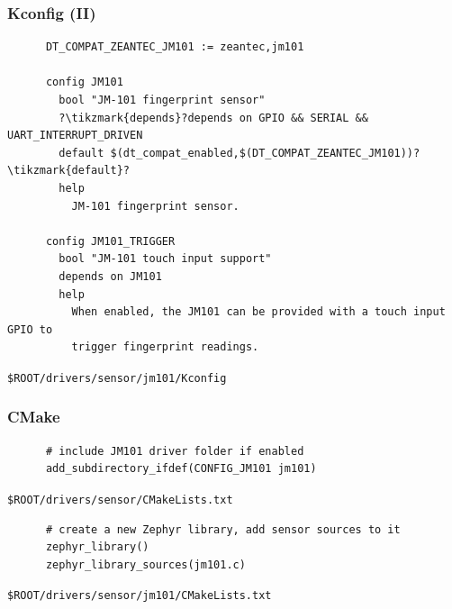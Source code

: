 \documentclass[handout]{beamer}
\begin{document}
\begin{frame}[fragile]
  \frametitle{Kconfig (II)}

  \vspace{2.5em}

  \begin{listing}[H]
    \begin{verbatim}
      DT_COMPAT_ZEANTEC_JM101 := zeantec,jm101

      config JM101
        bool "JM-101 fingerprint sensor"
        ?\tikzmark{depends}?depends on GPIO && SERIAL && UART_INTERRUPT_DRIVEN
        default $(dt_compat_enabled,$(DT_COMPAT_ZEANTEC_JM101))?\tikzmark{default}?
        help
          JM-101 fingerprint sensor.

      config JM101_TRIGGER
        bool "JM-101 touch input support"
        depends on JM101
        help
          When enabled, the JM101 can be provided with a touch input GPIO to
          trigger fingerprint readings.
    \end{verbatim}
    \caption{\texttt{\$ROOT/drivers/sensor/jm101/Kconfig}}
  \end{listing}

\end{frame}

\begin{frame}[fragile]
  \frametitle{CMake}

  \begin{listing}[H]
    \begin{verbatim}
      # include JM101 driver folder if enabled
      add_subdirectory_ifdef(CONFIG_JM101 jm101)
    \end{verbatim}
    \caption{\texttt{\$ROOT/drivers/sensor/CMakeLists.txt}}
  \end{listing}

  \begin{listing}[H]
    \begin{verbatim}
      # create a new Zephyr library, add sensor sources to it
      zephyr_library()
      zephyr_library_sources(jm101.c)
    \end{verbatim}
    \caption{\texttt{\$ROOT/drivers/sensor/jm101/CMakeLists.txt}
      \footnotemark}
  \end{listing}

\end{frame}
\end{document}
